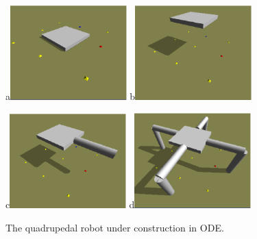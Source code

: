\documentclass[12pt]{article}
\begin{document}
\begin{figure}[!t]
\centerline{
a\includegraphics[width=0.4\textwidth]{Fig2a}
b\includegraphics[width=0.4\textwidth]{Fig2b}
}
\centerline{
c\includegraphics[width=0.4\textwidth]{Fig2c}
d\includegraphics[width=0.4\textwidth]{Fig2d}
}
\caption{The quadrupedal robot under construction in ODE.}
\label{Fig2}
\end{figure}
\end{document}
